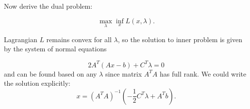 \documentclass[a4paper,12pt,russian]{extreport}
\begin{document}
Now derive the dual problem:

$$
\max_{\lambda} \inf_{x} L(x,\lambda).
$$

Lagrangian $L$ remains convex for all $\lambda$, so the solution to inner problem is given by the system of normal equations

$$
2A^T(Ax-b)+C^T\lambda=0
$$
and can be found based on any $\lambda$ since matrix $A^TA$ has full rank. We could write the solution explicitly:
$$
x=(A^TA)^{-1}\left(-\frac{1}{2}C^T\lambda+A^Tb\right).
$$
\end{document}
